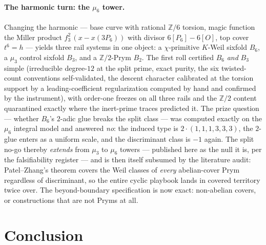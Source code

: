 \documentclass[11pt]{article}
\theoremstyle{definition}
\theoremstyle{remark}
\begin{document}
\paragraph{The harmonic turn: the $\mu_6$ tower.} Changing the harmonic ---
base curve with rational $\mathbb Z/6$ torsion, magic function the Miller
product $f_3^2\,(x-x(3P_6))$ with divisor $6[P_6]-6[O]$, top cover $t^6=h$
--- yields three rail systems in one object: a $\chi$-primitive $K$-Weil
sixfold $B_6$, a $\mu_3$ control sixfold $B_3$, and a $\mathbb Z/2$-Prym
$B_2$. The first roll certified $B_6$ \emph{and} $B_3$ simple (irreducible
degree-$12$ at the split prime, exact purity, the six twisted-count
conventions self-validated, the descent character calibrated at the torsion
support by a leading-coefficient regularization computed by hand and
confirmed by the instrument), with order-one freezes on all three rails and
the $\mathbb Z/2$ content quarantined exactly where the inert-prime traces
predicted it. The prize question --- whether $B_6$'s $2$-adic glue breaks
the split class --- was computed exactly on the $\mu_6$ integral model and
answered \emph{no}: the induced type is $2\cdot(1,1,1,3,3,3)$, the $2$-glue
enters as a uniform scale, and the discriminant class is $-1$ again. The
split no-go thereby \emph{extends} from $\mu_3$ to $\mu_6$ towers ---
published here as the null it is, per the falsifiability register --- and is
then itself subsumed by the literature audit: Patel--Zhang's theorem
\cite{PatelZhang} covers the Weil classes of \emph{every} abelian-cover Prym
regardless of discriminant, so the entire cyclic playbook lands in covered
territory twice over. The beyond-boundary specification is now exact:
non-abelian covers, or constructions that are not Pryms at all.

\section*{Conclusion}
\end{document}

